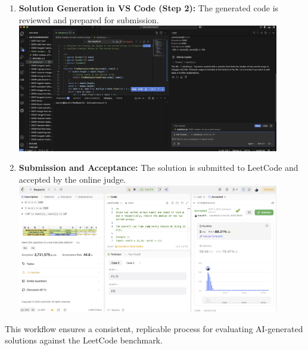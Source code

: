 \documentclass[12pt, a4paper]{article}
\begin{document}
\begin{enumerate}
    \item \textbf{Solution Generation in VS Code (Step 2):} The generated code is reviewed and prepared for submission.\\
    \includegraphics[width=0.9\textwidth]{vscode2.png}
    \item \textbf{Submission and Acceptance:} The solution is submitted to LeetCode and accepted by the online judge.\\
    \includegraphics[width=0.9\textwidth]{leetcodesubmitted.png}
\end{enumerate}

This workflow ensures a consistent, replicable process for evaluating AI-generated solutions against the LeetCode benchmark.
\end{document}
